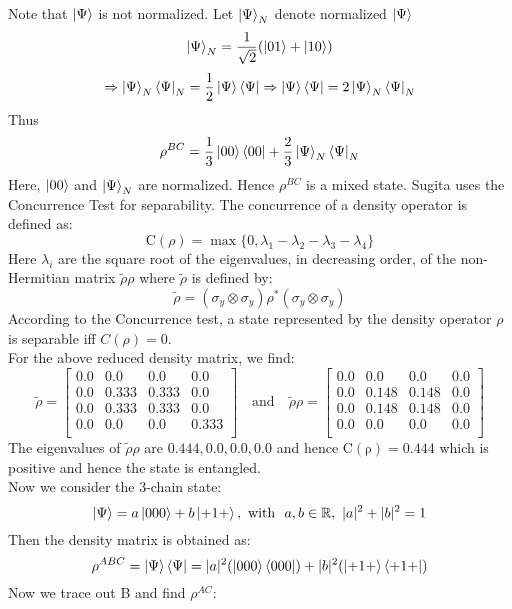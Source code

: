 \documentclass{scrartcl}
\begin{document}
Note that $\ket{\Psi}$ is not normalized.
Let $\ket{\Psi}_N$ denote normalized $\ket{\Psi}$
\[
\ket{\Psi}_N = \frac{1}{\sqrt{2}}(\ket{01}+\ket{10})
\]
\[
\Rightarrow \ket{\Psi}_N\bra{\Psi}_N= \frac{1}{2}\ket{\Psi}\bra{\Psi}
\Rightarrow \ket{\Psi}\bra{\Psi} = 2\ket{\Psi}_N\bra{\Psi}_N
\]
Thus 
\[
\rho^{BC} = \frac{1}{3}\ket{00}\bra{00}+\frac{2}{3}\ket{\Psi}_N\bra{\Psi}_N
\]
Here, $\ket{00}$ and $\ket{\Psi}_N$ are normalized. Hence $\rho^{BC}$ is a mixed state. Sugita uses the Concurrence Test\cite{Wootters1998} for separability. The concurrence of a density operator is defined as:
$$\mathrm{C}(\rho) = \max\{0,\lambda_1-\lambda_2-\lambda_3-\lambda_4\}$$
Here $\lambda_i$ are the square root of the eigenvalues, in decreasing order, of the non-Hermitian matrix $\tilde{\rho}\rho$ where $\tilde{\rho}$ is defined by:
$$\tilde{\rho} = (\sigma_y\otimes\sigma_y)\rho^*(\sigma_y\otimes\sigma_y)$$
According to the Concurrence test, a state represented by the density operator $\rho$ is separable iff $C(\rho)=0$. \\[0.3cm]
For the above reduced density matrix, we find:
\begin{equation*}
    \tilde{\rho} =
    \left[
    \begin{array}{cccc}
    0.0 & 0.0 & 0.0 & 0.0 \\
    0.0 & 0.333 & 0.333 & 0.0 \\
    0.0 & 0.333 & 0.333 & 0.0 \\
    0.0 & 0.0 & 0.0 & 0.333 \\
    \end{array}
    \right] \quad \text{and}\quad \tilde{\rho}\rho = 
        \left[
        \begin{array}{cccc}
        0.0 & 0.0 & 0.0 & 0.0 \\
        0.0 & 0.148 & 0.148 & 0.0 \\
        0.0 & 0.148 & 0.148 & 0.0 \\
        0.0 & 0.0 & 0.0 & 0.0 \\
        \end{array}
        \right]    
    \end{equation*}
    The eigenvalues of $\tilde{\rho}\rho$ are $0.444, 0.0,0.0,0.0$ and hence $\mathrm{C(\rho)} = 0.444$ which is positive and hence the state is entangled.\\[0.3cm]
Now we consider the 3-chain state:
\[
\ket{\Psi} = a\ket{000} + b\ket{+1+},  \text{ with } \ a,b \in \mathbb{R}, \  |a|^2+|b|^2=1
\]
Then the density matrix is obtained as:
\[
\rho^{ABC}=\ket{\Psi}\bra{\Psi} = |a|^2 (\ket{000}\bra{000})+|b|^2(\ket{+1+}\bra{+1+})
\]
Now we trace out B and find $\rho^{AC} $:
\end{document}

